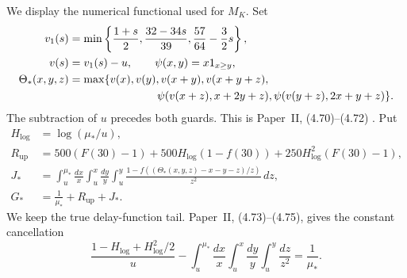 We display the numerical functional used for \(M_K\).
Set
\begin{equation}\label{eq:k2-canonical-profile}
\begin{aligned}
 v_1(s)&=\min\left\{\frac{1+s}{2},
             \frac{32-34s}{39},\frac{57}{64}-\frac32s\right\},\\
 v(s)&=v_1(s)-u,\qquad \psi(x,y)=x1_{x\ge y},\\
 \Theta_*(x,y,z)&=\max\{v(x),v(y),v(x+y),v(x+y+z),\\
 &\hspace{28mm}\psi(v(x+z),x+2y+z),
                   \psi(v(y+z),2x+y+z)\}.
\end{aligned}
\end{equation}
The subtraction of \(u\) precedes both guards.
This is Paper~II, (4.70)--(4.72)
\cite[(4.70)--(4.72)]{PaperII}.
Put
\begin{equation}\label{eq:k2-g-functional}
\begin{aligned}
 H_{\log}&=\log(\mu_*/u),\\
 R_{\mathrm{up}}&=500(F(30)-1)+500H_{\log}(1-f(30))
                    +250H_{\log}^2(F(30)-1),\\
 J_*&=\int_u^{\mu_*}\frac{dx}{x}
         \int_u^x\frac{dy}{y}
         \int_u^y\frac{1-f((\Theta_*(x,y,z)-x-y-z)/z)}{z^2}\,dz,\\
 G_*&=\frac1{\mu_*}+R_{\mathrm{up}}+J_*.
\end{aligned}
\end{equation}
We keep the true delay-function tail.
Paper~II, (4.73)--(4.75), gives the constant cancellation
\begin{equation}\label{eq:k2-constant-cancellation}
 \frac{1-H_{\log}+H_{\log}^2/2}{u}
 -\int_u^{\mu_*}\frac{dx}{x}\int_u^x\frac{dy}{y}
                         \int_u^y\frac{dz}{z^2}
 =\frac1{\mu_*}.
\end{equation}

